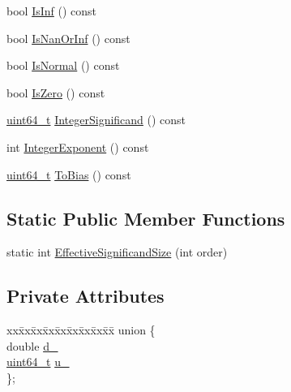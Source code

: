 \begin{DoxyCompactItemize}
\item 
bool \mbox{\hyperlink{classrapidjson_1_1internal_1_1_double_a5a67f00ff8711f46aed0a6c888f57b80}{Is\+Inf}} () const
\item 
bool \mbox{\hyperlink{classrapidjson_1_1internal_1_1_double_aef914e3e67857f80a6463ee4afc540e0}{Is\+Nan\+Or\+Inf}} () const
\item 
bool \mbox{\hyperlink{classrapidjson_1_1internal_1_1_double_a554e97e612896eeea1abcfb800145b81}{Is\+Normal}} () const
\item 
bool \mbox{\hyperlink{classrapidjson_1_1internal_1_1_double_a5f8ef8b899b1c8ff33ba4c78ecaf85ba}{Is\+Zero}} () const
\item 
\mbox{\hyperlink{stdint_8h_aec6fcb673ff035718c238c8c9d544c47}{uint64\+\_\+t}} \mbox{\hyperlink{classrapidjson_1_1internal_1_1_double_a91859964023326d3678b9b14b8dd2a16}{Integer\+Significand}} () const
\item 
int \mbox{\hyperlink{classrapidjson_1_1internal_1_1_double_a5d75c8b17eb36703ea78d940b85c5364}{Integer\+Exponent}} () const
\item 
\mbox{\hyperlink{stdint_8h_aec6fcb673ff035718c238c8c9d544c47}{uint64\+\_\+t}} \mbox{\hyperlink{classrapidjson_1_1internal_1_1_double_a26b58bad74356a267c137eb50aa21797}{To\+Bias}} () const
\end{DoxyCompactItemize}
\subsection*{Static Public Member Functions}
\begin{DoxyCompactItemize}
\item 
static int \mbox{\hyperlink{classrapidjson_1_1internal_1_1_double_a44c3a36f884e47baf47ee0474ea65354}{Effective\+Significand\+Size}} (int order)
\end{DoxyCompactItemize}
\subsection*{Private Attributes}
\begin{DoxyCompactItemize}
\item 
\begin{tabbing}
xx\=xx\=xx\=xx\=xx\=xx\=xx\=xx\=xx\=\kill
union \{\\
\>double \mbox{\hyperlink{classrapidjson_1_1internal_1_1_double_aed3fd8bcaac96183232d6277bf7248c1}{d\_}}\\
\>\mbox{\hyperlink{stdint_8h_aec6fcb673ff035718c238c8c9d544c47}{uint64\_t}} \mbox{\hyperlink{classrapidjson_1_1internal_1_1_double_a1f983c37796c260a9493b49d79f85516}{u\_}}\\
\}; \\

\end{tabbing}\end{DoxyCompactItemize}
